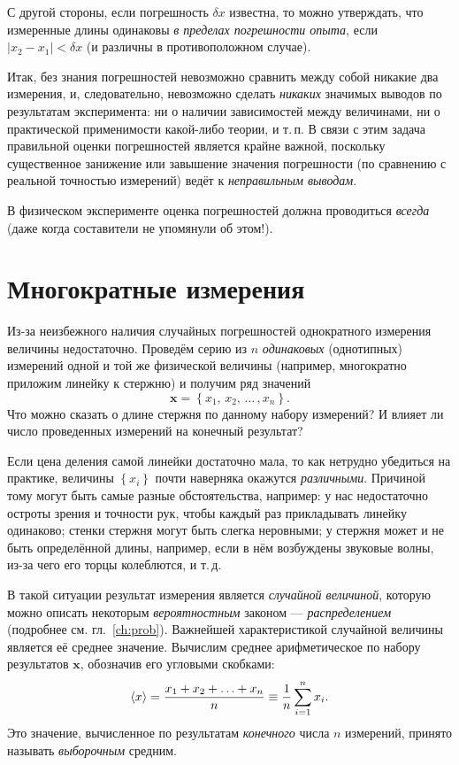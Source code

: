 С другой стороны, если погрешность $\delta x$ известна, то можно
утверждать, что измеренные длины одинаковы
\emph{в пределах погрешности опыта}, если $|x_{2}-x_{1}|<\delta x$
(и различны в противоположном случае).

Итак, без знания погрешностей невозможно сравнить между собой никакие
два измерения, и, следовательно, невозможно сделать \emph{никаких}
значимых выводов по результатам эксперимента: ни о наличии зависимостей
между величинами, ни о практической применимости какой-либо теории,
и т.\,п. В связи с этим задача правильной оценки погрешностей является крайне
важной, поскольку существенное занижение или завышение значения погрешности
(по сравнению с реальной точностью измерений) ведёт к \emph{неправильным выводам}.

В физическом эксперименте оценка погрешностей должна проводиться \emph{всегда}
(даже когда составители  не упомянули об этом!).

\section{Многократные измерения}

Из-за неизбежного наличия случайных погрешностей однократного измерения
величины недостаточно. Проведём серию из $n$ \emph{одинаковых} (однотипных) измерений одной
и той же физической величины (например, многократно приложим линейку к стержню) и получим
ряд значений
\[
\mathbf{x} = \left\{ x_{1},\,x_{2},\,\ldots\,,x_{n}\right\} .
\]
Что можно сказать о длине стержня по данному набору измерений?
И влияет ли число проведенных измерений на конечный результат?

Если цена деления самой линейки достаточно мала, то как нетрудно убедиться
на практике, величины $\left\{ x_{i}\right\}$ почти наверняка окажутся
\emph{различными}. Причиной тому могут быть
самые разные обстоятельства, например: у нас недостаточно остроты
зрения и точности рук, чтобы каждый раз прикладывать линейку одинаково;
стенки стержня могут быть слегка неровными; у стержня может и не быть
определённой длины, например, если в нём возбуждены звуковые волны,
из-за чего его торцы колеблются, и т.\,д.

В такой ситуации результат измерения является \emph{случайной величиной}, 
которую можно описать некоторым \emph{вероятностным} законом ---
\emph{распределением} (подробнее см. гл.~\ref{ch:prob}). Важнейшей характеристикой
случайной величины является её среднее значение.
Вычислим среднее арифметическое по набору результатов $\mathbf{x}$,
обозначив его угловыми скобками:
\begin{equation}
 \left<x\right>=\frac{x_{1}+x_{2}+\ldots+x_{n}}{n}\equiv\frac{1}{n}\sum\limits
_{i=1}^{n}x_{i}\label{eq:average}.
\end{equation}
Это значение, вычисленное по результатам \emph{конечного} числа $n$ измерений,
принято называть \emph{выборочным} средним.

